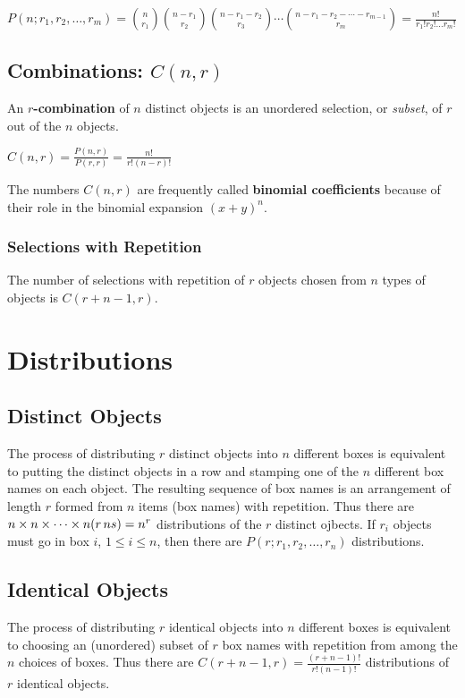 \documentclass{article}
\begin{document}
\begin{center}
$P(n;r_1,r_2,\dots,r_m)={n \choose r_1}{n-r_1 \choose r_2}{n-r_1-r_2
\choose r_3}\cdots{n-r_1-r_2-\cdots-r_{m-1} \choose r_m} = \frac{n!}{r_1!r_2!\dots r_m!}$
\end{center}

\subsection{Combinations: $C(n,r)$}
An \textbf{$r$-combination} of $n$ distinct objects is an unordered
selection, or \emph{subset}, of $r$ out of the $n$ objects.

\begin{center}
$C(n,r)=\frac{P(n,r)}{P(r,r)}=\frac{n!}{r!(n-r)!}$
\end{center}

The numbers $C(n,r)$ are frequently called \textbf{binomial
coefficients} because of their role in the binomial expansion $(x+y)^n$.

\subsubsection{Selections with Repetition}
The number of selections with repetition of $r$ objects chosen from $n$
types of objects is $C(r+n-1,r)$.

\section{Distributions}
\subsection{Distinct Objects}
The process of distributing $r$ distinct objects into $n$ different
boxes is equivalent to putting the distinct objects in a row and
stamping one of the $n$ different box names on each object. The
resulting sequence of box names is an arrangement of length $r$ formed
from $n$ items (box names) with repetition. Thus there are $n \times n
\times \cdots \times n (r\thinspace ns) = n^r$ distributions of the $r$ distinct
ojbects. If $r_i$ objects must go in box $i$, $1 \le i \le n$, then
there are $P(r; r_1, r_2,\dots,r_n)$ distributions.

\subsection{Identical Objects}
The process of distributing $r$ identical objects into $n$ different
boxes is equivalent to choosing an (unordered) subset of $r$ box names
with repetition from among the $n$ choices of boxes. Thus there are
$C(r+n-1,r) = \frac{(r+n-1)!}{r!(n-1)!}$ distributions of $r$ identical
objects.
\end{document}
